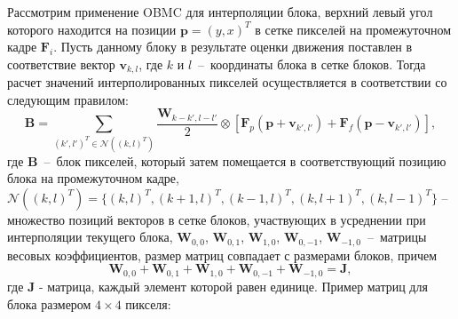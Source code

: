 Рассмотрим применение OBMC для интерполяции блока, верхний левый угол которого находится на позиции $\mathbf{p} = (y,x)^T$ в сетке пикселей на промежуточном кадре $\mathbf{F}_i$. Пусть данному блоку в результате оценки движения поставлен в соответствие вектор $\mathbf{v}_{k,l}$, где $k$ и $l$~--~координаты блока в сетке блоков. Тогда расчет значений интерполированных пикселей осуществляется в соответствии со следующим правилом:
\begin{equation*}
\mathbf{B} = \sum\limits_{(k',l')^T \in \mathcal{N}((k,l)^T)} \frac{\mathbf{W}_{k-k',l-l'}}{2} \otimes \left[ \mathbf{F}_p(\mathbf{p} + \mathbf{v}_{k',l'}) + \mathbf{F}_f(\mathbf{p} - \mathbf{v}_{k',l'}) \right],
\end{equation*}
где $\mathbf{B}$~--~блок пикселей, который затем помещается в соответствующий позицию блока на промежуточном кадре, $\mathcal{N}((k,l)^T) = \{ (k,l)^T, (k+1,l)^T, (k-1,l)^T, (k,l+1)^T, (k,l-1)^T \}$ – множество позиций векторов в сетке блоков, участвующих в усреднении при интерполяции текущего блока, $\mathbf{W}_{0,0}$, $\mathbf{W}_{0,1}$, $\mathbf{W}_{1,0}$, $\mathbf{W}_{0,-1}$, $\mathbf{W}_{-1,0}$~--~матрицы весовых коэффициентов, размер матриц совпадает с размерами блоков, причем
\begin{equation*}
\mathbf{W}_{0,0} + \mathbf{W}_{0,1} + \mathbf{W}_{1,0} + \mathbf{W}_{0,-1} + \mathbf{W}_{-1,0} = \mathbf{J},
\end{equation*}
где $\mathbf{J}$ - матрица, каждый элемент которой равен единице. Пример матриц для блока размером $4\times4$ пикселя:
